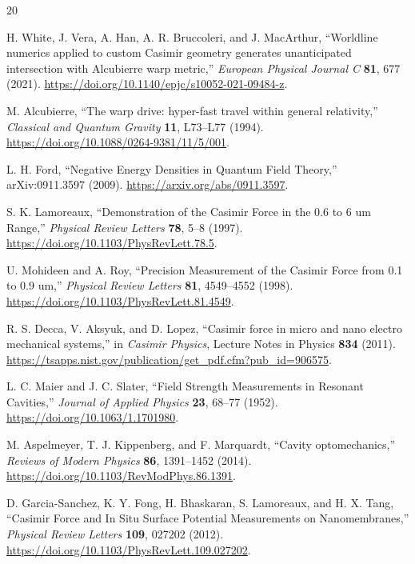 \documentclass[11pt]{article}
\begin{document}
\begingroup
\raggedright
\begin{thebibliography}{20}

H. White, J. Vera, A. Han, A. R. Bruccoleri, and J. MacArthur,
``Worldline numerics applied to custom Casimir geometry generates
unanticipated intersection with Alcubierre warp metric,''
\emph{European Physical Journal C} \textbf{81}, 677 (2021).
\url{https://doi.org/10.1140/epjc/s10052-021-09484-z}.

M. Alcubierre,
``The warp drive: hyper-fast travel within general relativity,''
\emph{Classical and Quantum Gravity} \textbf{11}, L73--L77 (1994).
\url{https://doi.org/10.1088/0264-9381/11/5/001}.

L. H. Ford,
``Negative Energy Densities in Quantum Field Theory,''
arXiv:0911.3597 (2009).
\url{https://arxiv.org/abs/0911.3597}.

S. K. Lamoreaux,
``Demonstration of the Casimir Force in the 0.6 to 6 um Range,''
\emph{Physical Review Letters} \textbf{78}, 5--8 (1997).
\url{https://doi.org/10.1103/PhysRevLett.78.5}.

U. Mohideen and A. Roy,
``Precision Measurement of the Casimir Force from 0.1 to 0.9 um,''
\emph{Physical Review Letters} \textbf{81}, 4549--4552 (1998).
\url{https://doi.org/10.1103/PhysRevLett.81.4549}.

R. S. Decca, V. Aksyuk, and D. Lopez,
``Casimir force in micro and nano electro mechanical systems,''
in \emph{Casimir Physics}, Lecture Notes in Physics \textbf{834} (2011).
\url{https://tsapps.nist.gov/publication/get_pdf.cfm?pub_id=906575}.

L. C. Maier and J. C. Slater,
``Field Strength Measurements in Resonant Cavities,''
\emph{Journal of Applied Physics} \textbf{23}, 68--77 (1952).
\url{https://doi.org/10.1063/1.1701980}.

M. Aspelmeyer, T. J. Kippenberg, and F. Marquardt,
``Cavity optomechanics,''
\emph{Reviews of Modern Physics} \textbf{86}, 1391--1452 (2014).
\url{https://doi.org/10.1103/RevModPhys.86.1391}.

D. Garcia-Sanchez, K. Y. Fong, H. Bhaskaran, S. Lamoreaux, and H. X. Tang,
``Casimir Force and In Situ Surface Potential Measurements on
Nanomembranes,''
\emph{Physical Review Letters} \textbf{109}, 027202 (2012).
\url{https://doi.org/10.1103/PhysRevLett.109.027202}.


\end{thebibliography}
\end{document}
